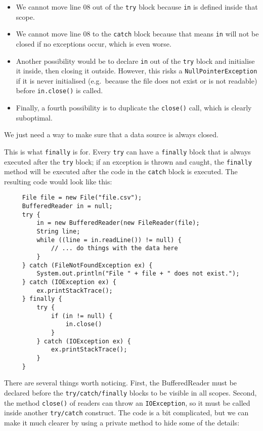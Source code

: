 \begin{itemize}
\item We cannot move 
  line 08 out of the \verb+try+ block because
  \verb+in+ is defined inside that scope.
\item We cannot move 
  line 08 to the \verb+catch+ block because that means
  \verb+in+ will not be closed if no exceptions occur, which is even
  worse. 
\item Another possibility would be to declare \verb+in+ out of the
  \verb+try+ block and initialise it inside, then closing it
  outside. However, this risks a \verb+NullPointerException+ if it is
  never initialised (e.g.~because the file does not exist or is not
  readable) before \verb+in.close()+ is called. 
\item Finally, a fourth possibility is to duplicate the \verb+close()+
  call, which is clearly suboptimal.
\end{itemize}

We just need a way to make sure that a data source is always closed. 

This is what \verb+finally+ is for. Every \verb+try+ can have a
\verb+finally+ block that is always executed after the \verb+try+
block; if an exception is thrown and caught, the \verb+finally+
method will be executed after the code in the \verb+catch+ block is
executed. The resulting code would look like this: 

\begin{verbatim}
     File file = new File("file.csv");
     BufferedReader in = null;
     try {
         in = new BufferedReader(new FileReader(file); 
         String line;
         while ((line = in.readLine()) != null) {
             // ... do things with the data here
         }
     } catch (FileNotFoundException ex) {
         System.out.println("File " + file + " does not exist.");
     } catch (IOException ex) {
         ex.printStackTrace();
     } finally { 
         try {
             if (in != null) {
                 in.close()
             }
         } catch (IOException ex) {
             ex.printStackTrace();
         }
     }
\end{verbatim}

There are several things worth noticing. First, the BufferedReader
must be declared before the \verb+try/catch/finally+ blocks to be
visible in all scopes. Second, the method \verb+close()+ of readers
can throw an \verb+IOException+, so it must be called inside another
\verb+try/catch+ construct. The code is a bit complicated, but we can
make it much clearer by using a private method to hide some of the
details: 

